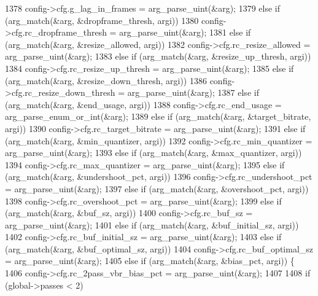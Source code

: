\begin{DoxyCodeInclude}
{{{{{{{{{{{{{{{{{{{{{{{{{{{{{{{{{{1378       config->cfg.g\_lag\_in\_frames = arg\_parse\_uint(&arg);
1379     \textcolor{keywordflow}{else} \textcolor{keywordflow}{if} (arg\_match(&arg, &dropframe\_thresh, argi))
1380       config->cfg.rc\_dropframe\_thresh = arg\_parse\_uint(&arg);
1381     \textcolor{keywordflow}{else} \textcolor{keywordflow}{if} (arg\_match(&arg, &resize\_allowed, argi))
1382       config->cfg.rc\_resize\_allowed = arg\_parse\_uint(&arg);
1383     \textcolor{keywordflow}{else} \textcolor{keywordflow}{if} (arg\_match(&arg, &resize\_up\_thresh, argi))
1384       config->cfg.rc\_resize\_up\_thresh = arg\_parse\_uint(&arg);
1385     \textcolor{keywordflow}{else} \textcolor{keywordflow}{if} (arg\_match(&arg, &resize\_down\_thresh, argi))
1386       config->cfg.rc\_resize\_down\_thresh = arg\_parse\_uint(&arg);
1387     \textcolor{keywordflow}{else} \textcolor{keywordflow}{if} (arg\_match(&arg, &end\_usage, argi))
1388       config->cfg.rc\_end\_usage = arg\_parse\_enum\_or\_int(&arg);
1389     \textcolor{keywordflow}{else} \textcolor{keywordflow}{if} (arg\_match(&arg, &target\_bitrate, argi))
1390       config->cfg.rc\_target\_bitrate = arg\_parse\_uint(&arg);
1391     \textcolor{keywordflow}{else} \textcolor{keywordflow}{if} (arg\_match(&arg, &min\_quantizer, argi))
1392       config->cfg.rc\_min\_quantizer = arg\_parse\_uint(&arg);
1393     \textcolor{keywordflow}{else} \textcolor{keywordflow}{if} (arg\_match(&arg, &max\_quantizer, argi))
1394       config->cfg.rc\_max\_quantizer = arg\_parse\_uint(&arg);
1395     \textcolor{keywordflow}{else} \textcolor{keywordflow}{if} (arg\_match(&arg, &undershoot\_pct, argi))
1396       config->cfg.rc\_undershoot\_pct = arg\_parse\_uint(&arg);
1397     \textcolor{keywordflow}{else} \textcolor{keywordflow}{if} (arg\_match(&arg, &overshoot\_pct, argi))
1398       config->cfg.rc\_overshoot\_pct = arg\_parse\_uint(&arg);
1399     \textcolor{keywordflow}{else} \textcolor{keywordflow}{if} (arg\_match(&arg, &buf\_sz, argi))
1400       config->cfg.rc\_buf\_sz = arg\_parse\_uint(&arg);
1401     \textcolor{keywordflow}{else} \textcolor{keywordflow}{if} (arg\_match(&arg, &buf\_initial\_sz, argi))
1402       config->cfg.rc\_buf\_initial\_sz = arg\_parse\_uint(&arg);
1403     \textcolor{keywordflow}{else} \textcolor{keywordflow}{if} (arg\_match(&arg, &buf\_optimal\_sz, argi))
1404       config->cfg.rc\_buf\_optimal\_sz = arg\_parse\_uint(&arg);
1405     \textcolor{keywordflow}{else} \textcolor{keywordflow}{if} (arg\_match(&arg, &bias\_pct, argi)) \{
1406       config->cfg.rc\_2pass\_vbr\_bias\_pct = arg\_parse\_uint(&arg);
1407 
1408       \textcolor{keywordflow}{if} (global->passes < 2)
}}}}}}}}}}}}}}}}}}}}}}}}}}}}}}}}}}
\end{DoxyCodeInclude}
